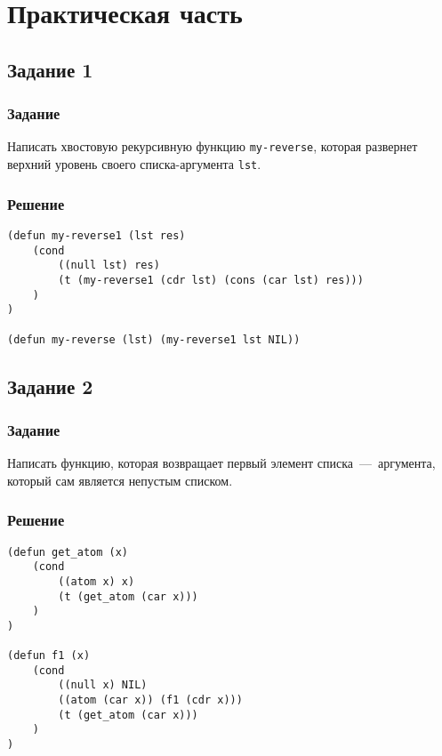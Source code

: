 \setcounter{page}{3}

\chapter{Практическая часть}

\section{Задание 1}
\subsection*{Задание}
Написать хвостовую рекурсивную функцию \texttt{my-reverse}, которая развернет верхний уровень своего списка-аргумента \texttt{lst}.

\subsection*{Решение}
\begin{code}
\begin{verbatim}
(defun my-reverse1 (lst res)
    (cond
        ((null lst) res)
        (t (my-reverse1 (cdr lst) (cons (car lst) res)))
    )
)

(defun my-reverse (lst) (my-reverse1 lst NIL))
\end{verbatim}
\end{code}


\section{Задание 2}
\subsection*{Задание}
Написать функцию, которая возвращает первый элемент списка~---~аргумента, который сам является непустым списком.

\subsection*{Решение}
\begin{code}
\begin{verbatim}
(defun get_atom (x)
    (cond
        ((atom x) x)
        (t (get_atom (car x)))
    )
)

(defun f1 (x)
    (cond
        ((null x) NIL)
        ((atom (car x)) (f1 (cdr x)))
        (t (get_atom (car x)))
    )
)
\end{verbatim}
\end{code}


